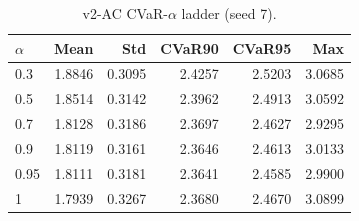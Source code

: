 \begin{table}[H]
    \centering
    \caption{v2-AC CVaR-$\alpha$ ladder (seed 7).}
    \label{tab:v2_ac_alpha}
    \begin{tabular}{@{}lrrrrr@{}}
        \toprule
        $\alpha$ & Mean & Std & CVaR90 & CVaR95 & Max \\
        \midrule
        0.3 & 1.8846 & 0.3095 & 2.4257 & 2.5203 & 3.0685 \\
        0.5 & 1.8514 & 0.3142 & 2.3962 & 2.4913 & 3.0592 \\
        0.7 & 1.8128 & 0.3186 & 2.3697 & 2.4627 & 2.9295 \\
        0.9 & 1.8119 & 0.3161 & 2.3646 & 2.4613 & 3.0133 \\
        0.95 & 1.8111 & 0.3181 & 2.3641 & 2.4585 & 2.9900 \\
        1 & 1.7939 & 0.3267 & 2.3680 & 2.4670 & 3.0899 \\
        \bottomrule
    \end{tabular}
\end{table}
